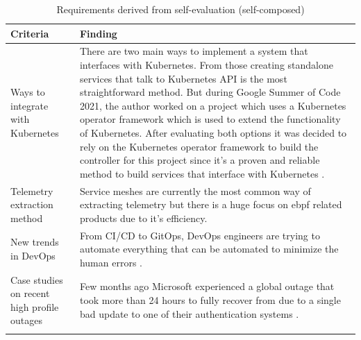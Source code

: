 \begin{longtable}{|p{50mm}|p{105mm}|}
    \hline
    \textbf{Criteria} &
    \textbf{Finding} \\ \hline

    Ways to integrate with Kubernetes &
    There are two main ways to implement a system that interfaces with Kubernetes. From those creating standalone services that talk to Kubernetes API is the most straightforward method. But during Google Summer of Code 2021, the author worked on a project which uses a Kubernetes operator framework which is used to extend the functionality of Kubernetes. After evaluating both options it was decided to rely on the Kubernetes operator framework to build the controller for this project since it's a proven and reliable method to build services that interface with Kubernetes \citep{Introduc93:online}. \\ \hline

    Telemetry extraction method &
    Service meshes are currently the most common way of extracting telemetry but there is a huge focus on \ac{ebpf} related products due to it’s efficiency. \\ \hline

    New trends in DevOps &
    From CI/CD to GitOps, DevOps engineers are trying to automate everything that can be automated to minimize the human errors \citep{CloudNat36:online}. \\ \hline

    Case studies on recent high profile outages &
    Few months ago Microsoft experienced a global outage that took more than 24 hours to fully recover from due to a single bad update to one of their authentication systems \citep{Microsof81:online}. \\ \hline
    
    \caption{Requirements derived from self-evaluation (self-composed)}
\end{longtable}


